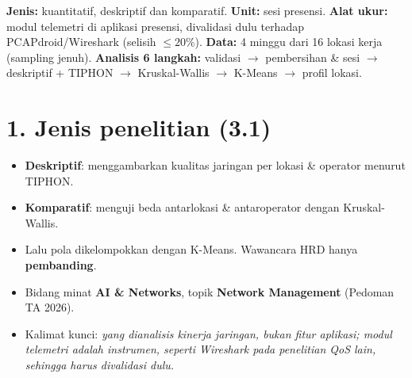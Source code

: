 


\begin{intinya}
\textbf{Jenis:} kuantitatif, deskriptif dan komparatif.
\textbf{Unit:} sesi presensi.
\textbf{Alat ukur:} modul telemetri di aplikasi presensi, divalidasi dulu terhadap PCAPdroid/Wireshark (selisih $\leq 20\%$).
\textbf{Data:} 4 minggu dari 16 lokasi kerja (sampling jenuh).
\textbf{Analisis 6 langkah:} validasi $\rightarrow$ pembersihan \& sesi $\rightarrow$ deskriptif + TIPHON $\rightarrow$ Kruskal-Wallis $\rightarrow$ K-Means $\rightarrow$ profil lokasi.
\end{intinya}

\section*{1. Jenis penelitian (3.1)}
\begin{itemize}
  \item \textbf{Deskriptif}: menggambarkan kualitas jaringan per lokasi \& operator menurut TIPHON.
  \item \textbf{Komparatif}: menguji beda antarlokasi \& antaroperator dengan Kruskal-Wallis.
  \item Lalu pola dikelompokkan dengan K-Means. Wawancara HRD hanya \textbf{pembanding}.
  \item Bidang minat \textbf{AI \& Networks}, topik \textbf{Network Management} (Pedoman TA 2026).
  \item Kalimat kunci: \textit{yang dianalisis kinerja jaringan, bukan fitur aplikasi; modul telemetri adalah instrumen, seperti Wireshark pada penelitian QoS lain, sehingga harus divalidasi dulu.}
\end{itemize}

